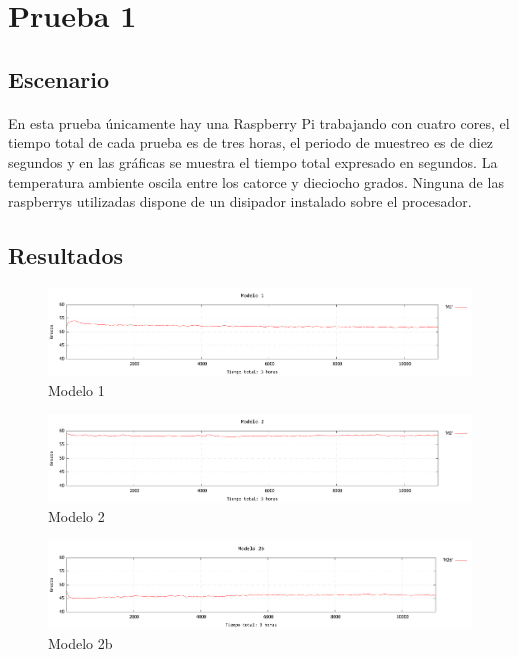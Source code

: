 \section{Prueba 1}
\label{makereference5.3}

\subsection{Escenario}
\paragraph{}

En esta prueba únicamente hay una Raspberry Pi trabajando con cuatro cores, el tiempo total de cada prueba es de tres horas, el periodo de muestreo es de diez segundos y en las gráficas se muestra el tiempo total expresado en segundos. La temperatura ambiente oscila entre los catorce y dieciocho grados. Ninguna de las raspberrys utilizadas dispone de un disipador instalado sobre el procesador.

\subsection{Resultados}

\begin{figure}[H]
	\centering
  	\includegraphics[width=160mm]{Test/Pr1_modelo1.pdf}
   	\caption[Prueba 1, Modelo 1]{Modelo 1}
   \label{figure5.1}
\end{figure}

\begin{figure}[H]
	\centering
  	\includegraphics[width=160mm]{Test/Pr1_modelo2.pdf}
   	\caption[Prueba 1, Modelo 2]{Modelo 2}
   \label{figure5.2}
\end{figure}

\begin{figure}[H]
	\centering
  	\includegraphics[width=160mm]{Test/Pr1_modelo2b.pdf}
   	\caption[Prueba 1, Modelo 2b]{Modelo 2b}
   \label{figure5.3}
\end{figure}

